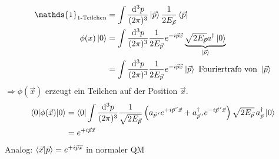 	\begin{align*}
		\mathds{1}_{\text{1-Teilchen}} &= \int \frac{\diff^3 p}{(2\pi)^3} \ket{\vec{p}} \frac{1}{2 E_{\vec{p}}} \bra{\vec{p}} \\
		\phi(x) \ket{0} &= \int \frac{\diff^3 p}{(2\pi)^3} \frac{1}{2 E_{\vec{p}}} e^{-i\vec{p} \vec{x}} 
		\underbrace{\sqrt{2 E_{\vec{p}}} a^\dagger \ket{0}}_{\mathclap{\ket{\vec{p}}}} \\
		&= \int \frac{\diff^3 p}{(2 \pi)^3} \frac{1}{2 E_{\vec{p}}} e^{-i\vec{p} \vec{x}} \ket{\vec{p}} \text{ Fouriertrafo von } \ket{\vec{p}}
	\end{align*}
$\Rightarrow \phi (\vec{x})$ erzeugt ein Teilchen auf der Position $\vec{x}$. 
	\begin{align*}
		\braket{0 | \phi(\vec{x}) | 0} &= 
		\braket{0 | \int \frac{\mathrm{d}^3 p}{(2 \pi)^3} \frac{1}{\sqrt{2 E_{\vec{p}}}} 
			\left(
				a_{\vec{p}\,'} e^{+i \vec{p}\,' \vec{x}} + a_{\vec{p}\,'}^\dagger e^{-i\vec{p}\,' \vec{x}}	
			\right) \sqrt{2 E_{\vec{p}}} \,a_{\vec{p}}^\dagger\,
		| 0} \\
		&= e^{+ i \vec{p} \vec{x}}
	\end{align*}
Analog: $ \braket{\vec{x} | \vec{p}} = e^{+ i \vec{p} \vec{x}}$ in normaler QM